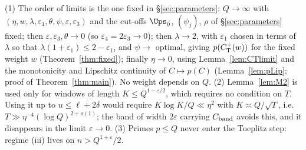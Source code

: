 \begin{remark}\label{rem:orderlimits}
(1) The order of limits is the one fixed in \S\ref{sec:parameters}: $Q\to\infty$ with $(\eta,w,\lambda,\varepsilon_1,\theta,\psi,\varepsilon,\varepsilon_3)$
and the cut-offs $\Ups_0$, $(\psi_j)$, $\rho$ of \S\ref{sec:parameters} fixed; then $\varepsilon,\varepsilon_3,\theta\to0$ (so $\varepsilon_4=2\varepsilon_3\to0$); then $\lambda\to2$, with $\varepsilon_1$ chosen in terms of $\lambda$ so that
$\lambda(1+\varepsilon_1)\le2-\varepsilon_1$, and $\psi\to$ optimal, giving $p(C^{+}_{\mathrm T}(w))$ for the fixed weight $w$ (Theorem~\ref{thm:fixed}); finally
$\eta\to0$, using Lemma~\ref{lem:CTlimit} and the monotonicity and Lipschitz continuity of $C\mapsto p(C)$ (Lemma~\ref{lem:pLip};
proof of Theorem~\ref{thm:main}). No weight
depends on $Q$.
(2) Lemma~\ref{lem:M2} is used only for windows of length $K\le Q^{1-\varepsilon/2}$, which requires no condition on $T$. Using it up to
$u\le\ell+2\delta$ would require $K\log K/Q\ll\eta^2$ with $K\asymp Q/\sqrt T$, i.e.\ $T\gg\eta^{-4}(\log Q)^{2+o(1)}$; the band of width $2\varepsilon$
carrying $C_{\rm band}$ avoids this, and it disappears in the limit $\varepsilon\to0$.
(3) Primes $p\le Q$ never enter the Toeplitz step: regime (iii) lives on $n>Q^{1+\varepsilon}/2$.
\end{remark}
